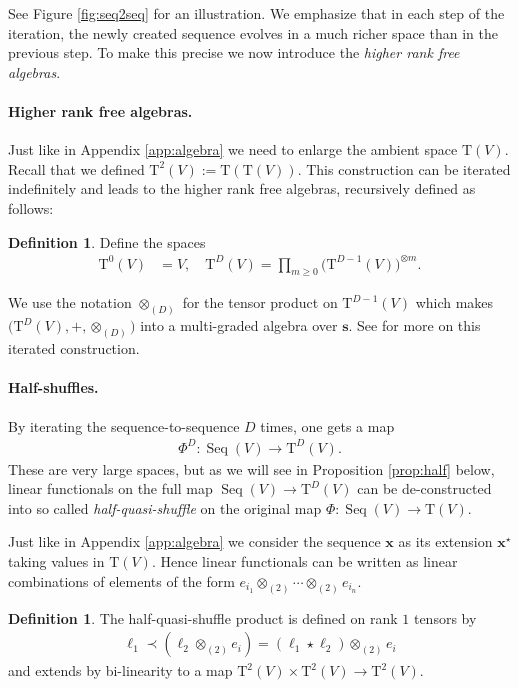 \documentclass{article} \usepackage{iclr2021_conference,times}
\def\vs{{\bm{s}}}
\newcommand{\bx}{\mathbf{x}}
\newcommand{\T}[1]{\mathrm{T}({#1})}
\newcommand{\Tra}[2]{\mathrm{T}^{{#1}}({#2})}
\newcommand{\Seq}[1]{\operatorname{Seq}(#1)}
\theoremstyle{plain}
\theoremstyle{definition}
\newtheorem{definition}[thm]{Definition}
\begin{document}
	See Figure \ref{fig:seq2seq} for an illustration. We emphasize that in each step of the iteration, the newly created sequence evolves in a much richer space than in the previous step. To make this precise we now introduce the \emph{higher rank free algebras}.
	
\paragraph{Higher rank free algebras.}	
	Just like in Appendix \ref{app:algebra} we need to enlarge the ambient space $ \T{V} $. Recall that we defined $ \Tra{2}{V} := \T{\T{V}} $. This construction can be iterated indefinitely and leads to the higher rank free algebras, recursively defined as follows:
	\begin{definition}
		Define the spaces
		\begin{align}
		\Tra{0}{V} &= V, \quad 
		\Tra{D}{V} = \prod_{m\geq 0} \big( \Tra{D-1}{V}\big)^{\otimes m}. 
		\end{align}
	\end{definition}
	We use the notation $ \otimes_{(D)} $ for the tensor product on $ \Tra{D-1}{V} $ which makes $ \big(\Tra{D}{V}, +, \otimes_{(D)}\big) $ into a multi-graded algebra over $ \vs $. See \citet{BCO20} for more on this iterated construction.
\paragraph{Half-shuffles.}	
	By iterating the sequence-to-sequence $ D $ times, one gets a map 
	\begin{align}
	\Phi^D : \Seq{V} \to \Tra{D}{V}.
	\end{align} 
	These are very large spaces, but as we will see in Proposition \ref{prop:half} below, linear functionals on the full map $ \Seq{V} \to \Tra{D}{V} $ can be de-constructed into so called \emph{half-quasi-shuffle} on the original map $ \Phi : \Seq{V} \to \T{V} $.
	
	Just like in Appendix \ref{app:algebra} we consider the sequence $ \bx $ as its extension $ \bx^\star $ taking values in $ \T{V} $. Hence linear functionals can be written as linear combinations of elements of the form $ e_{i_1} \otimes_{(2)} \cdots \otimes_{(2)} e_{i_n} $.
	
	\begin{definition}
		The half-quasi-shuffle product is defined on rank $ 1 $ tensors by
		\begin{align}
		\ell_1\prec (\ell_2\otimes_{(2)} e_i) = (\ell_1\star \ell_2)\otimes_{(2)} e_i 
		\end{align}
		and extends by bi-linearity to a map $ \Tra{2}{V}\times \Tra{2}{V} \to \Tra{2}{V} $.
	\end{definition}
	
\end{document}
